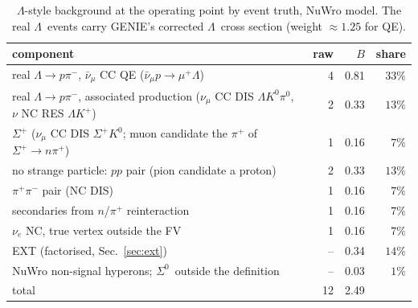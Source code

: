 \documentclass[11pt,a4paper]{article}
\newcommand{\Szero}{\ensuremath{\Sigma^{0}}}
\newcommand{\Lam}{\ensuremath{\Lambda}}
\newcommand{\numubar}{\ensuremath{\bar{\nu}_\mu}}
\begin{document}
\begin{table}[h]\centering
\caption{\Lam-style background at the operating point by event truth, NuWro model. The real
\Lam\ events carry GENIE's corrected \Lam\ cross section (weight $\approx1.25$ for QE).}
\label{tab:lsbkg}
\small
\begin{tabular}{lrrr}
\toprule
component & raw & $B$ & share \\
\midrule
real $\Lam\to p\pi^-$, $\numubar$ CC QE ($\numubar p\to\mu^+\Lam$) & 4 & 0.81 & $33\%$ \\
real $\Lam\to p\pi^-$, associated production ($\nu_\mu$ CC DIS $\Lam K^0\pi^0$, $\nu$ NC RES $\Lam K^+$) & 2 & 0.33 & $13\%$ \\
$\Sigma^+$ ($\nu_\mu$ CC DIS $\Sigma^+K^0$; muon candidate the $\pi^+$ of $\Sigma^+\to n\pi^+$) & 1 & 0.16 & $7\%$ \\
no strange particle: $pp$ pair (pion candidate a proton) & 2 & 0.33 & $13\%$ \\
\phantom{no strange particle:} $\pi^+\pi^-$ pair (NC DIS) & 1 & 0.16 & $7\%$ \\
\phantom{no strange particle:} secondaries from $n$/$\pi^+$ reinteraction & 1 & 0.16 & $7\%$ \\
\phantom{no strange particle:} $\nu_e$ NC, true vertex outside the FV & 1 & 0.16 & $7\%$ \\
EXT (factorised, Sec.~\ref{sec:ext}) & -- & 0.34 & $14\%$ \\
NuWro non-signal hyperons; \Szero\ outside the definition & -- & 0.03 & $1\%$ \\
\midrule
total & 12 & 2.49 & \\
\bottomrule
\end{tabular}
\end{table}
\end{document}
